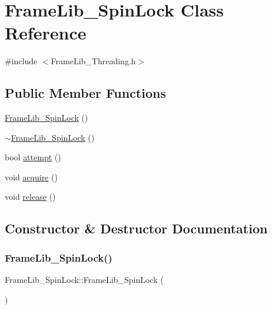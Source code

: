\hypertarget{class_frame_lib___spin_lock}{}\section{Frame\+Lib\+\_\+\+Spin\+Lock Class Reference}
\label{class_frame_lib___spin_lock}


{\ttfamily \#include $<$Frame\+Lib\+\_\+\+Threading.\+h$>$}

\subsection*{Public Member Functions}
\begin{DoxyCompactItemize}
\item 
\hyperlink{class_frame_lib___spin_lock_a1fdaf90d7d7fdc4efbbd46319f019b91}{Frame\+Lib\+\_\+\+Spin\+Lock} ()
\item 
\hyperlink{class_frame_lib___spin_lock_abfd0b5b37c9f8a3255648b9cac20ef05}{$\sim$\+Frame\+Lib\+\_\+\+Spin\+Lock} ()
\item 
bool \hyperlink{class_frame_lib___spin_lock_ab77f604b7e610535d0b48c5f2147daff}{attempt} ()
\item 
void \hyperlink{class_frame_lib___spin_lock_a9718ce6f4e9cb09d6d614e1e7c36a1ae}{acquire} ()
\item 
void \hyperlink{class_frame_lib___spin_lock_a99190b01885c12923f76822d1ba7fb1f}{release} ()
\end{DoxyCompactItemize}


\subsection{Constructor \& Destructor Documentation}
\mbox{\label{class_frame_lib___spin_lock_a1fdaf90d7d7fdc4efbbd46319f019b91}} 
\subsubsection{\texorpdfstring{Frame\+Lib\+\_\+\+Spin\+Lock()}{FrameLib\_SpinLock()}}
{\footnotesize\ttfamily Frame\+Lib\+\_\+\+Spin\+Lock\+::\+Frame\+Lib\+\_\+\+Spin\+Lock (\begin{DoxyParamCaption}{ }\end{DoxyParamCaption})\hspace{0.3cm}{\ttfamily [inline]}}

